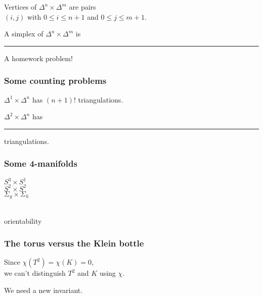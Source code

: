 \documentclass[14pt]{beamer}
\newcommand{\setbackgroundpicture}[1]{%
\usebackgroundtemplate{
\begin{pgfpicture}{0in}{0in}{\paperwidth}{\paperheight}
\pgfputat{\pgfxy(0,0)}{\texttt{[image: \#1]}}
\color{white}
\pgfsetfillopacity{0.8}
\pgfrect[fill]{\pgfxy(0,0)}{\pgfpoint{\paperwidth}{\paperheight}}
\end{pgfpicture}
}
}
\newcommand{\clearbackgroundpicture}{\usebackgroundtemplate{}}
\begin{document}
\begin{frame}

  Vertices of $\Delta^n \times \Delta^m$ are pairs \\
  $(i,j)$ with $0 \leq i \leq n+1$ and $0 \leq j \leq m+1$.

  \pause
  \vfill
  A simplex of $\Delta^n \times \Delta^m$ is \rule{48pt}{12pt}

  \vfill
  A homework problem!

\end{frame}

\begin{frame}
  \frametitle{Some counting problems}

  \vfill

  $\Delta^1 \times \Delta^n$ has $(n+1)!$ triangulations. \\

  \vfill

  $\Delta^2 \times \Delta^n$ has \rule{48pt}{12pt} triangulations.

  \vfill
  
\end{frame}


% 

\begin{frame}
  \frametitle{Some 4-manifolds}
  \Huge
  \vfill
  \begin{center}\pause
  $S^3 \times S^1$\\\pause
  $S^2 \times S^2$\\\pause
  $\Sigma_g \times \Sigma_h$
  \end{center}
  \vfill

\end{frame}

\setbackgroundpicture{Templo_de_Afaia3.JPG}
\begin{frame}
  \vfill
  \begin{center}
    \scalebox{5}{\Huge $w_1$} \\
   \vspace{2ex}orientability
  \end{center}
  \vfill
\end{frame}
\clearbackgroundpicture

\begin{frame}
  \frametitle{The torus versus the Klein bottle}

Since $\chi(T^2) = \chi(K) = 0$, \\
we can't distinguish $T^2$ and $K$ using $\chi$.

\pause
\vfill

We need a new invariant.

\vfill

\end{frame}
\end{document}
